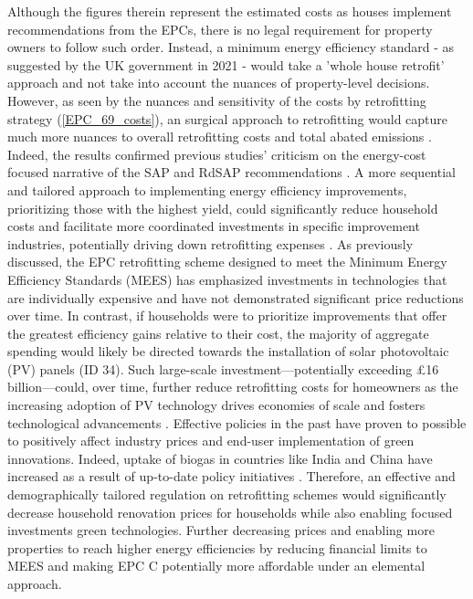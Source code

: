 Although the figures therein represent the estimated costs as houses implement recommendations from the EPCs, there is no legal requirement for property owners to follow such order. Instead, a minimum energy efficiency standard - as suggested by the UK government in 2021 - would take a 'whole house retrofit' approach and not take into account the nuances of property-level decisions. However, as seen by the nuances and sensitivity of the costs by retrofitting strategy (\ref{EPC_69_costs}), an surgical approach to retrofitting would capture much more nuances to overall retrofitting costs and total abated emissions \cite{alabid_review_2022, uk_green_building_council_ukgbc_retrofit_2021}.\textbf{ }Indeed, the results confirmed previous studies' criticism on the energy-cost focused narrative of the SAP and RdSAP recommendations \cite{kelly_building_2012} . A more sequential and tailored approach to implementing energy efficiency improvements, prioritizing those with the highest yield, could significantly reduce household costs and facilitate more coordinated investments in specific improvement industries, potentially driving down retrofitting expenses \cite{alabid_review_2022}. As previously discussed, the EPC retrofitting scheme designed to meet the Minimum Energy Efficiency Standards (MEES) has emphasized investments in technologies that are individually expensive and have not demonstrated significant price reductions over time. In contrast, if households were to prioritize improvements that offer the greatest efficiency gains relative to their cost, the majority of aggregate spending would likely be directed towards the installation of solar photovoltaic (PV) panels (ID 34). Such large-scale investment—potentially exceeding £16 billion—could, over time, further reduce retrofitting costs for homeowners as the increasing adoption of PV technology drives economies of scale and fosters technological advancements \cite{lafond_how_2018}. Effective policies in the past have proven to possible to positively affect industry prices and end-user implementation of green innovations.  Indeed, uptake of biogas in countries like India and China have increased as a result of up-to-date policy initiatives \cite{abanades_critical_2022}. Therefore, an effective and demographically tailored regulation on retrofitting schemes would significantly decrease household renovation prices for households while also enabling focused investments green technologies. Further decreasing prices and enabling more properties to reach higher energy efficiencies by reducing financial limits to MEES and making EPC C potentially more affordable under an elemental approach. \\

